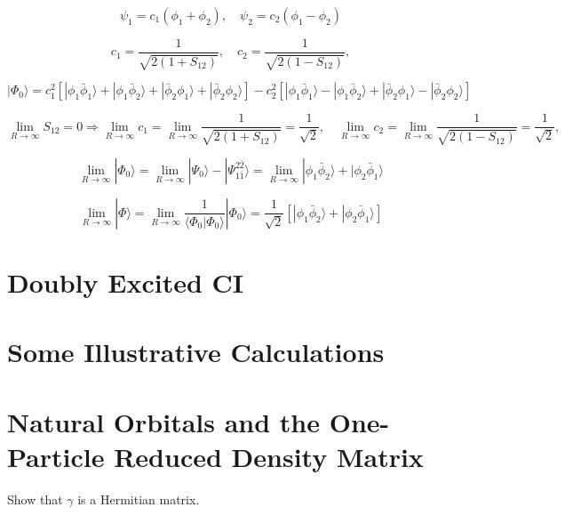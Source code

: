 \documentclass[a4paper]{book}
\begin{document}
\begin{solution}
	\[
		\psi_1 = c_1 ( \phi_1 + \phi_2 ), \quad \psi_2 = c_2 ( \phi_1 - \phi_2 )
	\]
	
	\[
		c_1 = \frac{1}{ \sqrt{ 2( 1+S_{12} ) } }, \quad c_2 = \frac{1}{ \sqrt{ 2( 1-S_{12} ) } },
	\]
	
	\[
		| \Phi_0 \rangle = c^2_1 \left[ | \phi_1 \bar{\phi}_1 \rangle + | \phi_1 \bar{\phi}_2 \rangle + | \bar{\phi}_2 \phi_1 \rangle + | \bar{\phi}_2 \phi_2 \rangle \right] - c^2_2 \left[ | \phi_1 \bar{\phi}_1 \rangle - | \phi_1 \bar{\phi}_2 \rangle + | \bar{\phi}_2 \phi_1 \rangle - | \bar{\phi}_2 \phi_2 \rangle \right]
	\]
	
	\[
		\lim_{R \rightarrow \infty} S_{12} = 0 \Rightarrow \lim_{R \rightarrow \infty} c_1 = \lim_{R \rightarrow \infty} \frac{1}{ \sqrt{ 2( 1+S_{12} ) } } = \frac{1}{ \sqrt{2} }, \quad \lim_{R \rightarrow \infty} c_2 = \lim_{R \rightarrow \infty} \frac{1}{ \sqrt{ 2( 1-S_{12} ) } } = \frac{1}{ \sqrt{2} },
	\]
	
	\[
		\lim_{R \rightarrow \infty} | \Phi_0 \rangle = \lim_{R \rightarrow \infty} | \Psi_0 \rangle - | \Psi^{2 \bar{2}}_{1 \bar{1}} \rangle = \lim_{R \rightarrow \infty} | \phi_1 \bar{\phi}_2 \rangle + | \phi_2 \bar{\phi}_1 \rangle
	\]
	
	\[
		\lim_{R \rightarrow \infty} | \Phi \rangle = \lim_{R \rightarrow \infty} \frac{1}{ \langle \Phi_0 | \Phi_0 \rangle } | \Phi_0 \rangle = \frac{1}{ \sqrt{2} } \left[ | \phi_1 \bar{\phi}_2 \rangle + | \phi_2 \bar{\phi}_1 \rangle \right] 
	\]
	
	\end{solution}
	
	\section{Doubly Excited CI}
	
	\section{Some Illustrative Calculations}
	
	\section{Natural Orbitals and the One-Particle Reduced Density Matrix}
	
	\begin{exercise}
	Show that $\gamma$ is a Hermitian matrix.
	\end{exercise}
	
\end{document}
